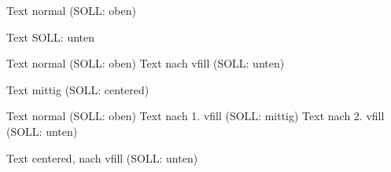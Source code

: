 \documentclass[a4paper,10pt]{tubsreprt}
\begin{document}
\begin{gausspage}
  \begin{segment}[bgcolor=tuBlueLight]{4}
    Text normal (SOLL: oben)
  \end{segment}
  \begin{segment}[b,bgcolor=tuBlueLight60]{4}
    Text SOLL: unten
  \end{segment}
\end{gausspage}

\begin{gausspage}
  \begin{segment}[bgcolor=tuBlueLight]{4}
    Text normal (SOLL: oben)
    \vfill
    Text nach vfill (SOLL: unten)
  \end{segment}
  \begin{segment}[c,bgcolor=tuBlueLight60]{4}
    Text mittig (SOLL: centered)
  \end{segment}
\end{gausspage}

\begin{gausspage}
  \begin{segment}[bgcolor=tuBlueLight]{4}
    Text normal (SOLL: oben)
    \vfill
    Text nach 1. vfill (SOLL: mittig)
    \vfill
    Text nach 2. vfill (SOLL: unten)
  \end{segment}
  \begin{segment}[c,bgcolor=tuBlueLight60]{4}
    \vfill
    Text centered, nach vfill (SOLL: unten)
  \end{segment}
\end{gausspage}
\end{document}
